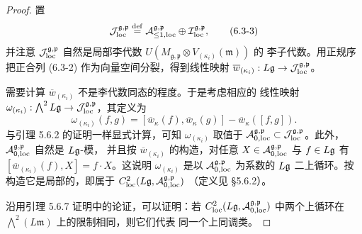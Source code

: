 \begin{proof}
    置
    \begin{equation}
        \mathcal{J}^{\mathfrak g,\mathfrak p}_{\mathrm{loc}}
        \overset{\mathrm{def}}{=}
        \mathcal{A}^{\mathfrak g,\mathfrak p}_{\le1,\mathrm{loc}}
        \oplus\mathcal{I}^{\mathfrak g,\mathfrak p}_{\mathrm{loc}},
        \tag{6.3-3}
    \end{equation}
    并注意 $\mathcal{J}^{\mathfrak g,\mathfrak p}_{\mathrm{loc}}$ 自然是局部李代数
    $U(M_{\mathfrak g,\mathfrak p}\otimes V_{(\kappa_i)}(\mathfrak m))$ 的
    李子代数。用正规序把正合列 (6.3-2) 作为向量空间分裂，得到线性映射
    $\overline w_{(\kappa_i)}:L\mathfrak{g}\to
    \mathcal{J}^{\mathfrak g,\mathfrak p}_{\mathrm{loc}}$。

    需要计算 $\overline w_{(\kappa_i)}$ 不是李代数同态的程度。于是考虑相应的
    线性映射 $\omega_{(\kappa_i)}:\bigwedge^2L\mathfrak{g}\to
    \mathcal{J}^{\mathfrak g,\mathfrak p}_{\mathrm{loc}}$，其定义为
    \[
        \omega_{(\kappa_i)}(f,g)
        =\left[\overline w_\kappa(f),\overline w_\kappa(g)\right]
        -\overline w_\kappa([f,g]).
    \]
    与引理 5.6.2 的证明一样显式计算，可知 $\omega_{(\kappa_i)}$ 取值于
    $\mathcal{A}^{\mathfrak g,\mathfrak p}_{0,\mathrm{loc}}\subset
    \mathcal{J}^{\mathfrak g,\mathfrak p}_{\mathrm{loc}}$。此外，
    $\mathcal{A}^{\mathfrak g,\mathfrak p}_{0,\mathrm{loc}}$ 自然是 $L\mathfrak{g}$-模，
    并且按 $\overline w_{(\kappa_i)}$ 的构造，对任意
    $X\in\mathcal{A}^{\mathfrak g,\mathfrak p}_{0,\mathrm{loc}}$ 与 $f\in L\mathfrak{g}$ 有
    $[\overline w_{(\kappa_i)}(f),X]=f\cdot X$。这说明
    $\omega_{(\kappa_i)}$ 是以
    $\mathcal{A}^{\mathfrak g,\mathfrak p}_{0,\mathrm{loc}}$ 为系数的 $L\mathfrak{g}$
    二上循环。按构造它是局部的，即属于
    $C^2_{\mathrm{loc}}(L\mathfrak{g},\mathcal{A}^{\mathfrak g,\mathfrak p}_{0,\mathrm{loc}})$
    （定义见 \S5.6.2）。

    沿用引理 5.6.7 证明中的论证，可以证明：若
    $C^2_{\mathrm{loc}}(L\mathfrak{g},\mathcal{A}^{\mathfrak g,\mathfrak p}_{0,\mathrm{loc}})$
    中两个上循环在 $\bigwedge^2(L\mathfrak m)$ 上的限制相同，则它们代表
    同一个上同调类。


\end{proof}
